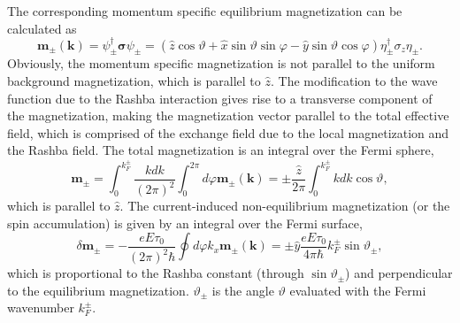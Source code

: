 \documentclass[12pt]{iopart}
\begin{document}
The corresponding momentum specific equilibrium magnetization can be calculated as
\begin{equation}
\textbf{m}_\pm (\textbf{k}) = \psi ^\dagger _\pm \bm {\sigma} \psi_\pm = (\hat {z} \cos \vartheta + \hat {x} \sin \vartheta \sin \varphi - \hat {y} \sin \vartheta \cos \varphi) \eta^ \dagger _\pm \sigma_z \eta_ \pm.
\end{equation}
Obviously, the momentum specific magnetization is not parallel to the uniform background magnetization, which is parallel to $\hat {z}$. The modification to the wave function due to the Rashba interaction gives rise to a transverse component of the magnetization, making the magnetization vector parallel to the total effective field, which is comprised of the exchange field due to the local magnetization and the Rashba field. The total magnetization is an integral over the Fermi sphere,
\begin{equation}
\textbf{m}_\pm =  \int_0 ^ {k_ F ^ \pm} \frac {k dk} {(2\pi)^2}  \int _0 ^ {2 \pi} d\varphi \textbf {m} _\pm (\textbf{k}) = \pm \frac {\hat {z}} {2\pi} \int_0 ^ {k_ F ^ \pm} k dk \cos \vartheta,
\end{equation}
which is parallel to $\hat {z}$. The current-induced non-equilibrium magnetization (or the spin accumulation) is given by an integral over the Fermi surface,
\begin{equation}
\delta \textbf{m} _\pm = - \frac{e E \tau_0} {(2\pi)^2\hbar} \oint d \varphi k_x \textbf {m} _\pm (\textbf{k})  = \pm \hat {y} \frac{e E \tau_0} {4\pi\hbar} k_ F ^ \pm \sin \vartheta_ \pm,
\end{equation}
which is proportional to the Rashba constant (through $\sin \vartheta_\pm$) and perpendicular to the equilibrium magnetization. $\vartheta_\pm$ is the angle $\vartheta$ evaluated with the Fermi wavenumber $k_ F ^ \pm$.
\end{document}
